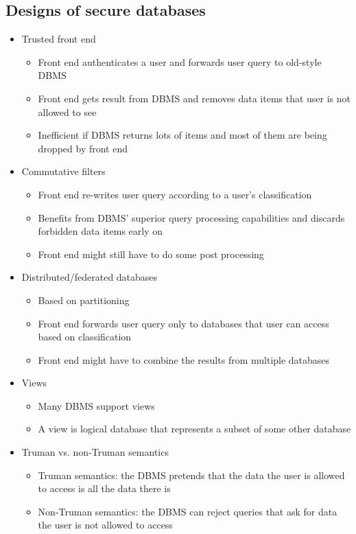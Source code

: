 \documentclass[twoside]{article}
\begin{document}
\subsection{Designs of secure databases}
\begin{itemize}
\item Trusted front end 
\begin{itemize}
\item Front end authenticates a user and forwards user query to old-style DBMS
\item Front end gets result from DBMS and removes data items that user is not allowed to see
\item Inefficient if DBMS returns lots of items and most of them are being dropped by front end
\end{itemize}
\item Commutative filters
\begin{itemize}
\item Front end re-writes user query according to a user’s classification
\item Benefits from DBMS’ superior query processing capabilities and discards forbidden data items early on
\item Front end might still have to do some post processing
\end{itemize}
\item Distributed/federated databases
\begin{itemize}
\item Based on partitioning
\item Front end forwards user query only to databases that user can access based on classification
\item Front end might have to combine the results from multiple databases
\end{itemize}
\item Views
\begin{itemize}
\item Many DBMS support views
\item A view is logical database that represents a subset of some other database
\end{itemize}
\item Truman vs. non-Truman semantics
\begin{itemize}
\item Truman semantics: the DBMS pretends that the data the user is allowed to access is all the data there is
\item Non-Truman semantics: the DBMS can reject queries that ask for data the user is not allowed to access
\end{itemize}
\end{itemize}
\end{document}
